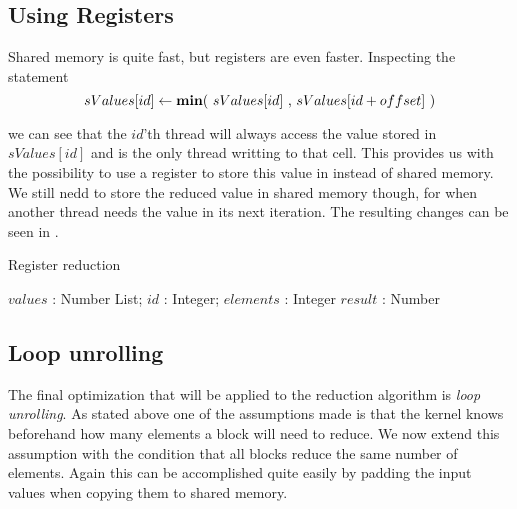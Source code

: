 \subsection{Using Registers}

Shared memory is quite fast, but registers are even faster. Inspecting
the statement 
\begin{displaymath}
  sValues[id] \leftarrow \text{\textbf{min}$($ $sValues[id]$ , $sValues[id + offset]$ $)$}
\end{displaymath}

we can see that the $id$'th thread will always access the value stored in
$sValues[id]$ and is the only thread writting to that cell. This provides us
with the possibility to use a register to store this value in instead of shared
memory. We still nedd to store the reduced value in shared memory though, for
when another thread needs the value in its next iteration. The resulting changes
can be seen in .

\begin{algorithm}
  \caption{Register reduction}
  \label{alg:registerReduct}
  \begin{algorithmic}
              {$values$ : Number List; $id$ : Integer; $elements$ : Integer}
              {$result$ : Number}
              {
                \SYNC
                  \ENDIF
                  \SYNC
                \ENDWHILE
                \ENDIF
              }
  \end{algorithmic}
\end{algorithm}



\subsection{Loop unrolling}\label{sec:loopUnrolling}


The final optimization that will be applied to the reduction algorithm
is \textit{loop unrolling}. As stated above one of the assumptions
made is that the kernel knows beforehand how many elements a block
will need to reduce. We now extend this assumption with the condition
that all blocks reduce the same number of elements. Again this can be
accomplished quite easily by padding the input values when copying
them to shared memory. 


